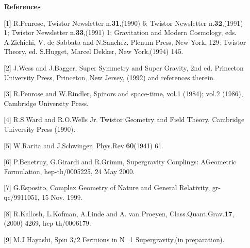 \documentclass[a4paper,12pt]{article}
\begin{document}
\vfill
\eject
\vskip 16pt
{\bf References}
\vskip 16pt
\begin{description}
\item{[1]} R.Penrose, Twistor Newsletter n.{\bf 31},(1990) 6; Twistor Newsletter n.{\bf 32},(1991) 1; Twistor Newsletter n.{\bf 33},(1991) 1; Gravitation and Modern Cosmology, eds. A.Zichichi, V. de Sabbata and N.Sanchez, Plenum Press, New York, 129; Twistor Theory, ed. S.Hugget, Marcel Dekker, New York,(1994) 145.
\item{[2]} J.Wess and J.Bagger, Super Symmetry and Super Gravity, 2nd ed. Princeton University Press, Princeton, New Jersey, (1992) and references therein.
\item{[3]} R.Penrose and W.Rindler, Spinors and space-time, vol.1 (1984); vol.2 (1986), Cambridge University Press.
\item{[4]} R.S.Ward and R.O.Wells Jr. Twistor Geometry and Field Theory, Cambridge University Press (1990).
\item{[5]} W.Rarita and J.Schwinger, Phys.Rev.{\bf 60}(1941) 61.
\item{[6]} P.Benetruy, G.Girardi and R.Grimm, Supergravity Couplings: AGeometric Formulation, hep-th/0005225, 24 May 2000.
\item{[7]} G.Esposito, Complex Geometry of Nature and General Relativity, gr-qc/9911051, 15 Nov. 1999.
\item{[8]} R.Kallosh, L.Kofman, A.Linde and A. van Proeyen, Class.Quant.Grav.{\bf 17},(2000) 4269, hep-th/0006179.
\item{[9]} M.J.Hayashi, Spin 3/2 Fermions in N=1 Supergravity,(in preparation).
\end{description}
\vfill
\eject
\end{document}
